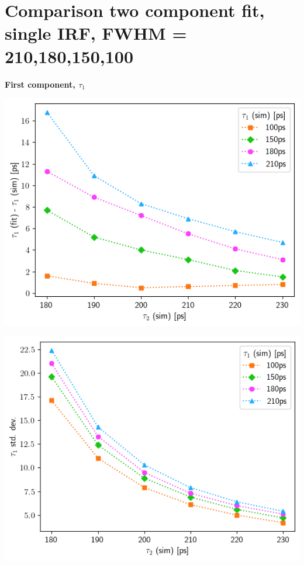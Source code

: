 {\section{\boldmath Comparison two component fit, single IRF, FWHM = 210,180,150,100\unboldmath\label{comp-irf}}

\textbf{First component, $\tau_1$}

\begin{minipage}{.47\linewidth}
     
    \includegraphics[width=\linewidth]{Batch 3/single Gaussian IRF/t1-diff 2080.png}
    \label{fig:compirf-t1-2080}
\end{minipage}
\hfill
\begin{minipage}{.47\linewidth}
     
    \includegraphics[width=\linewidth]{Batch 3/single Gaussian IRF/t1-err 2080.png}
    \label{fig:compirf-t1err-2080}
\end{minipage}
\begin{minipage}{.47\linewidth}
     

\end{minipage}}
